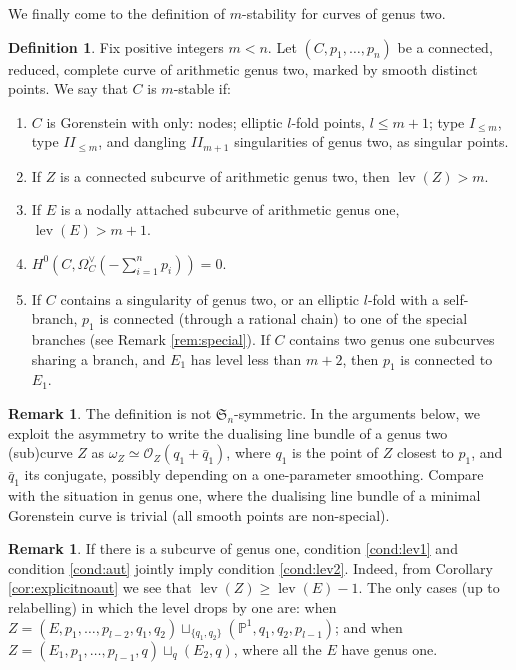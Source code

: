 \documentclass[11pt]{amsart}
\newcommand{\PP}{\mathbb P}
\newcommand{\OO}{\mathcal O}
\newcommand{\lev}{\operatorname{lev}}
\theoremstyle{plain}
\theoremstyle{definition}
\newtheorem{dfn}[thm]{Definition}
\newtheorem{rem}[thm]{Remark}
\begin{document}
We finally come to the definition of $m$-stability for curves of genus two.
\begin{dfn}\label{def:m-stability}
 Fix positive integers $m<n$. Let $(C,p_1,\ldots,p_n)$ be a connected, reduced, complete curve of arithmetic genus two, marked by smooth distinct points. We say that $C$ is $m$-stable if:
 \begin{enumerate}[leftmargin=.7cm]
  \item\label{cond:sing} $C$ is Gorenstein with only: nodes; elliptic $l$-fold points, $l\leq m+1$; type $I_{\leq m}$, type $I\!I_{\leq m}$, and dangling $I\!I_{m+1}$ singularities of genus two, as singular points.
  \item\label{cond:lev2} If $Z$ is a connected subcurve of arithmetic genus two, then $\lev(Z)>m$.
  \item\label{cond:lev1} If $E$ is a nodally attached subcurve of arithmetic genus one, $\lev(E)>m+1$.
  \item\label{cond:aut} $H^0(C,\Omega_C^\vee(-\sum_{i=1}^n p_i))=0$.
  \item\label{cond:p1} If $C$ contains a singularity of genus two, or an elliptic $l$-fold with a self-branch, $p_1$ is connected (through a rational chain) to one of the special branches (see Remark \ref{rem:special}). If $C$ contains two genus one subcurves sharing a branch, and $E_1$ has level less than $m+2$, then $p_1$ is connected to $E_1$.
 \end{enumerate}
\end{dfn}

\begin{rem}
 The definition is not $\mathfrak{S}_n$-symmetric. In the arguments below, we exploit the asymmetry to write the dualising line bundle of a genus two (sub)curve $Z$ as $\omega_Z\simeq\OO_Z(q_1+\bar q_1)$, where $q_1$ is the point of $Z$ closest to $p_1$, and $\bar q_1$ its conjugate, possibly depending on a one-parameter smoothing. Compare with the situation in genus one, where the dualising line bundle of a minimal Gorenstein curve is trivial (all smooth points are non-special).
\end{rem}

\begin{rem}\label{rmk:lev1solev2}
 If there is a subcurve of genus one, condition \eqref{cond:lev1} and condition \eqref{cond:aut} jointly imply condition \eqref{cond:lev2}. Indeed, from Corollary \ref{cor:explicitnoaut} we see that $\lev(Z)\geq\lev(E)-1$. The only cases (up to relabelling) in which the level drops by one are: when $Z=(E,p_1,\ldots,p_{l-2},q_1,q_2)\sqcup_{\{q_1,q_2\}}(\PP^1,q_1,q_2,p_{l-1})$; and when $Z=(E_1,p_1,\ldots,p_{l-1},q)\sqcup_q(E_2,q)$, where all the $E$ have genus one.
\end{rem}
\end{document}
